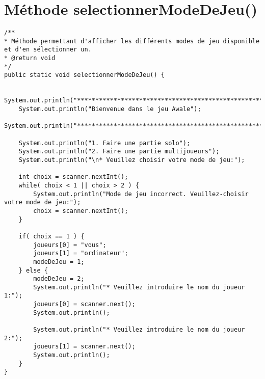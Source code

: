 \documentclass[11pt,a4paper]{report}
\begin{document}
        \newpage

    \section{Méthode selectionnerModeDeJeu()}
        \begin{lstlisting}
/**
* Méthode permettant d'afficher les différents modes de jeu disponible et d'en sélectionner un.
* @return void
*/
public static void selectionnerModeDeJeu() {

    System.out.println("**************************************************************");
    System.out.println("Bienvenue dans le jeu Awale");
    System.out.println("**************************************************************\n");

    System.out.println("1. Faire une partie solo");
    System.out.println("2. Faire une partie multijoueurs");
    System.out.println("\n* Veuillez choisir votre mode de jeu:");

    int choix = scanner.nextInt();
    while( choix < 1 || choix > 2 ) {
        System.out.println("Mode de jeu incorrect. Veuillez-choisir votre mode de jeu:");
        choix = scanner.nextInt();
    }

    if( choix == 1 ) {
        joueurs[0] = "vous";
        joueurs[1] = "ordinateur";
        modeDeJeu = 1;
    } else {
        modeDeJeu = 2;
        System.out.println("* Veuillez introduire le nom du joueur 1:");
        joueurs[0] = scanner.next();
        System.out.println();

        System.out.println("* Veuillez introduire le nom du joueur 2:");
        joueurs[1] = scanner.next();
        System.out.println();
    }
}
        \end{lstlisting}

        \newpage
\end{document}
